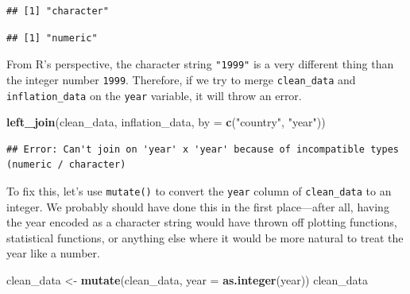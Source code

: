 \documentclass[
  12pt,
  oneside,openany]{book}
\newenvironment{Shaded}{\begin{snugshade}}{\end{snugshade}}
\newcommand{\DataTypeTok}[1]{\textcolor[rgb]{0.13,0.29,0.53}{#1}}
\newcommand{\KeywordTok}[1]{\textcolor[rgb]{0.13,0.29,0.53}{\textbf{#1}}}
\newcommand{\NormalTok}[1]{#1}
\newcommand{\OperatorTok}[1]{\textcolor[rgb]{0.81,0.36,0.00}{\textbf{#1}}}
\newcommand{\StringTok}[1]{\textcolor[rgb]{0.31,0.60,0.02}{#1}}
\begin{document}
\begin{Shaded}
\end{Shaded}

\begin{verbatim}
## [1] "character"
\end{verbatim}

\begin{Shaded}
\end{Shaded}

\begin{verbatim}
## [1] "numeric"
\end{verbatim}

From R's perspective, the character string \texttt{"1999"} is a very different thing than the integer number \texttt{1999}. Therefore, if we try to merge \texttt{clean\_data} and \texttt{inflation\_data} on the \texttt{year} variable, it will throw an error.

\begin{Shaded}
\begin{Highlighting}[]
\KeywordTok{left\_join}\NormalTok{(clean\_data,}
\NormalTok{          inflation\_data,}
          \DataTypeTok{by =} \KeywordTok{c}\NormalTok{(}\StringTok{"country"}\NormalTok{, }\StringTok{"year"}\NormalTok{))}
\end{Highlighting}
\end{Shaded}

\begin{verbatim}
## Error: Can't join on 'year' x 'year' because of incompatible types (numeric / character)
\end{verbatim}

To fix this, let's use \texttt{mutate()} to convert the \texttt{year} column of \texttt{clean\_data} to an integer. We probably should have done this in the first place---after all, having the year encoded as a character string would have thrown off plotting functions, statistical functions, or anything else where it would be more natural to treat the year like a number.

\begin{Shaded}
\begin{Highlighting}[]
\NormalTok{clean\_data <{-}}\StringTok{ }\KeywordTok{mutate}\NormalTok{(clean\_data,}
                     \DataTypeTok{year =} \KeywordTok{as.integer}\NormalTok{(year))}
\NormalTok{clean\_data}
\end{Highlighting}
\end{Shaded}
\end{document}
